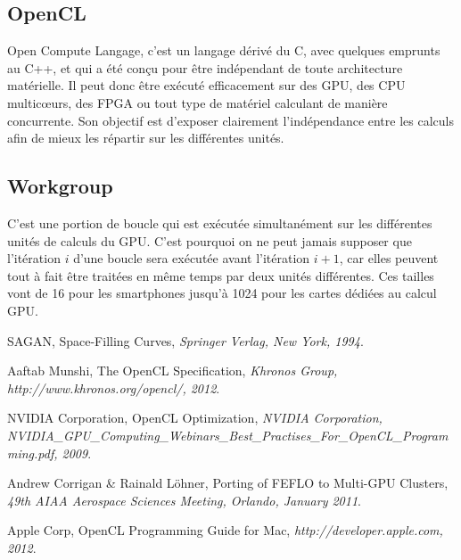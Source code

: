 \documentclass[a4paper,12pt]{article}
\begin{document}
\subsection{OpenCL}
Open Compute Langage, c'est un langage dérivé du C, avec quelques emprunts au C++, et qui a été conçu pour être indépendant de toute architecture matérielle. Il peut donc être exécuté efficacement sur des GPU, des CPU multic\oe urs, des FPGA ou tout type de matériel calculant de manière concurrente. Son objectif est d'exposer clairement l'indépendance entre les calculs afin de mieux les répartir sur les différentes unités.

\subsection{Workgroup}
C'est une portion de boucle qui est exécutée simultanément sur les différentes unités de calculs du GPU. C'est pourquoi on ne peut jamais supposer que l'itération $i$ d'une boucle sera exécutée avant l'itération $i+1$, car elles peuvent tout à fait être traitées en même temps par deux unités différentes. Ces tailles vont de 16 pour les smartphones jusqu'à 1024 pour les cartes dédiées au calcul GPU.


%
%


\begin{thebibliography}{99}
\small

	SAGAN,
	Space-Filling Curves,
	\emph{Springer Verlag, New York, 1994}.

	Aaftab Munshi,
	The OpenCL Specification,
	\emph{Khronos Group, http://www.khronos.org/opencl/, 2012}.

	NVIDIA Corporation,
	OpenCL Optimization,
	\emph{NVIDIA Corporation, NVIDIA\_GPU\_Computing\_Webinars\_Best\_Practises\_For\_OpenCL\_Programming.pdf, 2009}.

	Andrew Corrigan \& Rainald Löhner,
	Porting of FEFLO to Multi-GPU Clusters,
	\emph{49th AIAA Aerospace Sciences Meeting, Orlando, January 2011}.

	Apple Corp,
	OpenCL Programming Guide for Mac,
	\emph{http://developer.apple.com, 2012}.



\end{thebibliography}
\end{document}
